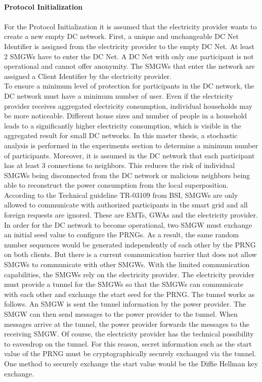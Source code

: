 \\
\textbf{Protocol Initialization}
\\
\\
For the Protocol Initialization it is assumed that the electricity provider wants to create a new empty DC network. First, a unique and unchangeable DC Net Identifier is assigned from the electricity provider to the empty DC Net. At least 2 SMGWs have to enter the DC Net. A DC Net with only one participant is not operational and cannot offer anonymity. 
The SMGWs that enter the network are assigned a Client Identifier by the electricity provider.\\
To ensure a minimum level of protection for participants in the DC network, the DC network must have a minimum number of user. Even if the electricity provider receives aggregated electricity consumption, individual households may be more noticeable. Different house sizes and number of people in a household leads to a significantly higher electricity consumption, which is visible in the aggregated result for small DC networks. In this master thesis, a stochastic analysis is performed in the experiments section to determine a minimum number of participants. Moreover, it is assumed in the DC network that each participant has at least 3 connections to neighbors. This reduces the risk of individual SMGWs being disconnected from the DC network or malicious neighbors being able to reconstruct the power consumption from the local superposition.\\
According to the Technical guideline TR-03109 from BSI, SMGWs are only allowed to communicate with authorized participants in the smart grid and all foreign requests are ignored. These are EMTs, GWAs and the electricity provider. In order for the DC network to become operational, two SMGW must exchange an initial seed value to configure the PRNGs. %
As a result, the same random number sequences would be generated independently of each other by the PRNG on both clients. But there is a current communication barrier that does not allow SMGWs to communicate with other SMGWs. With the limited communication capabilities, the SMGWs rely on the electricity provider. The electricity provider must provide a tunnel for the SMGWs so that the SMGWs can communicate with each other and exchange the start seed for the PRNG. The tunnel works as follows. An SMGW is sent the tunnel information by the power provider. The SMGW can then send messages to the power provider to the tunnel. When messages arrive at the tunnel, the power provider forwards the messages to the receiving SMGW. Of course, the electricity provider has the technical possibility to eavesdrop on the tunnel. For this reason, secret information such as the start value of the PRNG must be cryptographically securely exchanged via the tunnel. One method to securely exchange the start value would be the Diffie Hellman key exchange.\\
